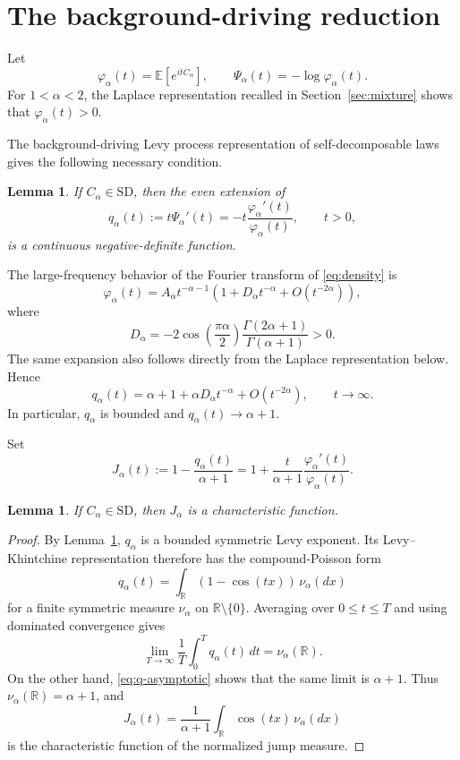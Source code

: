 \documentclass[11pt]{article}
\newtheorem{lemma}[theorem]{Lemma}
\theoremstyle{remark}
\newcommand{\R}{\mathbb{R}}
\newcommand{\E}{\mathbb{E}}
\newcommand{\SD}{\mathrm{SD}}
\begin{document}
\section{The background-driving reduction}

Let
\[
 \varphi_\alpha(t)=\E[e^{itC_\alpha}],
 \qquad
 \Psi_\alpha(t)=-\log\varphi_\alpha(t).
\]
For $1<\alpha<2$, the Laplace representation recalled in
Section~\ref{sec:mixture} shows that $\varphi_\alpha(t)>0$.

The background-driving Levy process representation of
self-decomposable laws \cite{JurekVervaat1983,Sato1999} gives the
following necessary condition.

\begin{lemma}\label{lem:bdlp}
If $C_\alpha\in\SD$, then the even extension of
\[
 q_\alpha(t)
 :=t\Psi_\alpha'(t)
 =-t\frac{\varphi_\alpha'(t)}{\varphi_\alpha(t)},
 \qquad t>0,
\]
is a continuous negative-definite function.
\end{lemma}

The large-frequency behavior of the Fourier transform of
\eqref{eq:density} is
\begin{equation}\label{eq:phi-asymptotic}
 \varphi_\alpha(t)
 =A_\alpha t^{-\alpha-1}
  \left(1+D_\alpha t^{-\alpha}
  +O(t^{-2\alpha})\right),
\end{equation}
where
\begin{equation}\label{eq:Dalpha}
 D_\alpha
 =-2\cos\left(\frac{\pi\alpha}{2}\right)
   \frac{\Gamma(2\alpha+1)}{\Gamma(\alpha+1)}
 >0.
\end{equation}
The same expansion also follows directly from the Laplace
representation below.  Hence
\begin{equation}\label{eq:q-asymptotic}
 q_\alpha(t)
 =\alpha+1+\alpha D_\alpha t^{-\alpha}
  +O(t^{-2\alpha}),
 \qquad t\longrightarrow\infty.
\end{equation}
In particular, $q_\alpha$ is bounded and
$q_\alpha(t)\to\alpha+1$.

Set
\begin{equation}\label{eq:Jdef}
 J_\alpha(t)
 :=1-\frac{q_\alpha(t)}{\alpha+1}
 =1+\frac{t}{\alpha+1}
      \frac{\varphi_\alpha'(t)}{\varphi_\alpha(t)}.
\end{equation}

\begin{lemma}\label{lem:jumpcf}
If $C_\alpha\in\SD$, then $J_\alpha$ is a characteristic function.
\end{lemma}

\begin{proof}
By Lemma~\ref{lem:bdlp}, $q_\alpha$ is a bounded symmetric
Levy exponent.  Its Levy--Khintchine representation therefore has
the compound-Poisson form
\[
 q_\alpha(t)
 =\int_{\R}(1-\cos(tx))\,\nu_\alpha(dx)
\]
for a finite symmetric measure $\nu_\alpha$ on
$\R\setminus\{0\}$.  Averaging over $0\leq t\leq T$ and using
dominated convergence gives
\[
 \lim_{T\to\infty}\frac1T\int_0^Tq_\alpha(t)\,dt
 =\nu_\alpha(\R).
\]
On the other hand, \eqref{eq:q-asymptotic} shows that the same limit
is $\alpha+1$.  Thus $\nu_\alpha(\R)=\alpha+1$, and
\[
 J_\alpha(t)
 =\frac1{\alpha+1}\int_{\R}\cos(tx)\,\nu_\alpha(dx)
\]
is the characteristic function of the normalized jump measure.
\end{proof}
\end{document}
